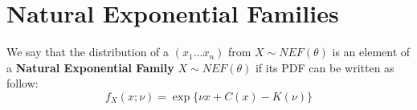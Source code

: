 \section{Natural Exponential Families}
\begin{defi}
	We say that the distribution of a \rs $(x_1...x_n)$ from $X\sim NEF(\theta)$ is an element of a \textbf{Natural Exponential Family}	$X\sim NEF(\theta)$ if its PDF can be written as follow:
	$$f_X(x;\nu)=\exp \{ \nu x + C(x) -K(\nu) \}$$
\end{defi}


